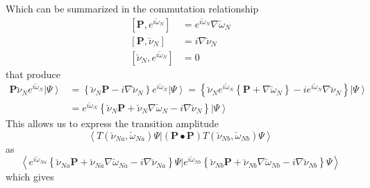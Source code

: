 \documentclass[aps,preprint]{revtex4}%
\begin{document}
Which can be summarized in the commutation relationship
\begin{align}
\left[  \mathbf{P,}e^{i\breve{\omega}_{N}}\right]   &  =e^{i\breve{\omega}%
_{N}}\nabla\breve{\omega}_{N}\nonumber\\
\left[  \mathbf{P,}\breve{\nu}_{N}\right]   &  =i\nabla\breve{\nu}%
_{N}\nonumber\\
\left[  \breve{\nu}_{N},e^{i\breve{\omega}_{N}}\right]   &  =0
\end{align}
that produce
\begin{align}
\mathbf{P}\breve{\nu}_{N}e^{i\breve{\omega}_{N}}\left\vert \Psi\right\rangle
&  =\left\{  \breve{\nu}_{N}\mathbf{P}-i\nabla\breve{\nu}_{N}\right\}
e^{i\breve{\omega}_{N}}\left\vert \Psi\right\rangle =\left\{  \breve{\nu}%
_{N}e^{i\breve{\omega}_{N}}\left\{  \mathbf{P}+\nabla\breve{\omega}%
_{N}\right\}  -ie^{i\breve{\omega}_{N}}\nabla\breve{\nu}_{N}\right\}
\left\vert \Psi\right\rangle \nonumber\\
&  =e^{i\breve{\omega}_{N}}\left\{  \breve{\nu}_{N}\mathbf{P+}\breve{\nu}%
_{N}\nabla\breve{\omega}_{N}-i\nabla\breve{\nu}_{N}\right\}  \left\vert
\Psi\right\rangle
\end{align}
This allows us to express the transition amplitude%
\begin{equation}
\left\langle T\left(  \breve{\nu}_{Na},\breve{\omega}_{Na}\right)
\Psi|\left(  \mathbf{P\bullet P}\right)  T\left(  \breve{\nu}_{Nb}%
,\breve{\omega}_{Nb}\right)  \Psi\right\rangle
\end{equation}
as
\begin{equation}
\left\langle e^{i\breve{\omega}_{Na}}\left\{  \breve{\nu}_{Na}\mathbf{P+}%
\breve{\nu}_{Na}\nabla\breve{\omega}_{Na}-i\nabla\breve{\nu}_{Na}\right\}
\Psi|e^{i\breve{\omega}_{Nb}}\left\{  \breve{\nu}_{Nb}\mathbf{P+}\breve{\nu
}_{Nb}\nabla\breve{\omega}_{Nb}-i\nabla\breve{\nu}_{Nb}\right\}
\Psi\right\rangle
\end{equation}
which gives
\end{document}
